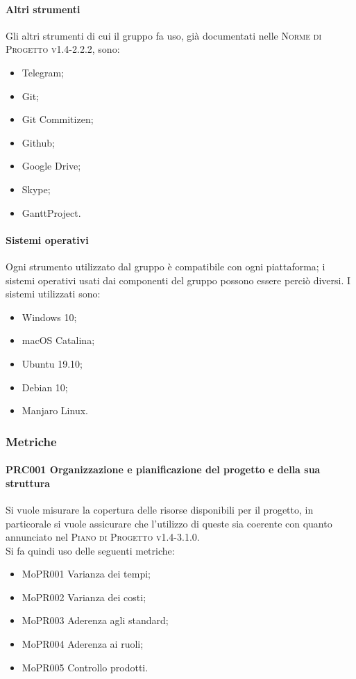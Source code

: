 \paragraph{Altri strumenti}
Gli altri strumenti di cui il gruppo fa uso, già documentati nelle \textsc{Norme di Progetto v1.4-2.2.2}, sono:
\begin{itemize}
  \item Telegram;
  \item Git;
  \item Git Commitizen;
  \item Github;
  \item Google Drive;
  \item Skype;
  \item GanttProject.
\end{itemize}

\paragraph{Sistemi operativi}
Ogni strumento utilizzato dal gruppo è compatibile con ogni piattaforma; i sistemi operativi usati dai componenti del gruppo possono essere perciò diversi. I sistemi utilizzati sono:
\begin{itemize}
  \item Windows 10;
  \item macOS Catalina;
  \item Ubuntu 19.10;
  \item Debian 10;
  \item Manjaro Linux.
\end{itemize}

\subsubsection{Metriche}
\paragraph{PRC001 Organizzazione e pianificazione del progetto e della sua struttura}
Si vuole misurare la copertura delle risorse disponibili per il progetto, in particorale si vuole assicurare che l'utilizzo di queste sia coerente con quanto annunciato nel \textsc{Piano di Progetto v1.4-3.1.0}. \\
Si fa quindi uso delle seguenti metriche:
\begin{itemize}
  \item MoPR001 Varianza dei tempi;
  \item MoPR002 Varianza dei costi;
  \item MoPR003 Aderenza agli standard;
  \item MoPR004 Aderenza ai ruoli;
  \item MoPR005 Controllo prodotti.
\end{itemize}

